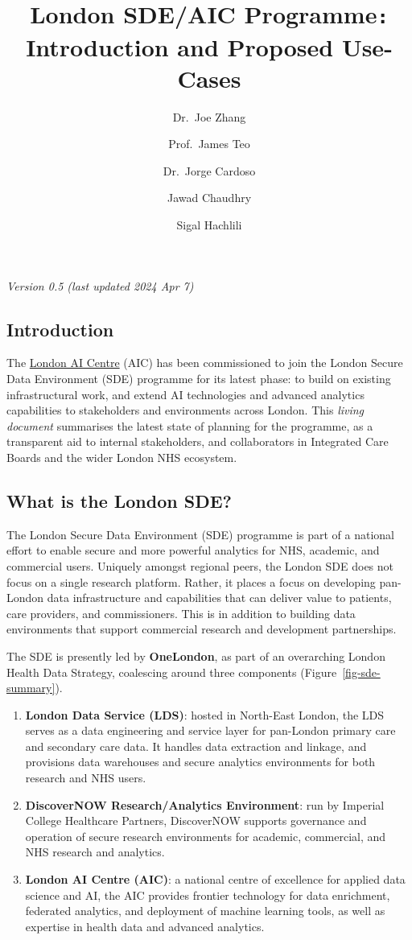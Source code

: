 \documentclass[
  letterpaper,
  DIV=11,
  numbers=noendperiod]{scrartcl}
\title{London SDE/AIC Programme\texttt{:} Introduction and Proposed
Use-Cases}
\author{Dr.~Joe Zhang \and Prof.~James Teo \and Dr.~Jorge
Cardoso \and Jawad Chaudhry \and Sigal Hachlili}
\date{}
\begin{document}
\maketitle

\emph{Version 0.5 (last updated 2024 Apr 7)}

\subsection{Introduction}\label{introduction}

The \href{https://www.aicentre.co.uk/}{London AI Centre} (AIC) has been
commissioned to join the London Secure Data Environment (SDE) programme
for its latest phase: to build on existing infrastructural work, and
extend AI technologies and advanced analytics capabilities to
stakeholders and environments across London. This \emph{living document}
summarises the latest state of planning for the programme, as a
transparent aid to internal stakeholders, and collaborators in
Integrated Care Boards and the wider London NHS ecosystem.

\subsection{What is the London SDE?}\label{what-is-the-london-sde}

The London Secure Data Environment (SDE) programme is part of a national
effort to enable secure and more powerful analytics for NHS, academic,
and commercial users. Uniquely amongst regional peers, the London SDE
does not focus on a single research platform. Rather, it places a focus
on developing pan-London data infrastructure and capabilities that can
deliver value to patients, care providers, and commissioners. This is in
addition to building data environments that support commercial research
and development partnerships.

The SDE is presently led by \textbf{OneLondon}, as part of an
overarching London Health Data Strategy, coalescing around three
components (Figure~\ref{fig-sde-summary}).

\begin{enumerate}
\def\labelenumi{(\arabic{enumi})}
\item
  \textbf{London Data Service (LDS)}: hosted in North-East London, the
  LDS serves as a data engineering and service layer for pan-London
  primary care and secondary care data. It handles data extraction and
  linkage, and provisions data warehouses and secure analytics
  environments for both research and NHS users.
\item
  \textbf{DiscoverNOW Research/Analytics Environment}: run by Imperial
  College Healthcare Partners, DiscoverNOW supports governance and
  operation of secure research environments for academic, commercial,
  and NHS research and analytics.
\item
  \textbf{London AI Centre (AIC)}: a national centre of excellence for
  applied data science and AI, the AIC provides frontier technology for
  data enrichment, federated analytics, and deployment of machine
  learning tools, as well as expertise in health data and advanced
  analytics.
\end{enumerate}
\end{document}

